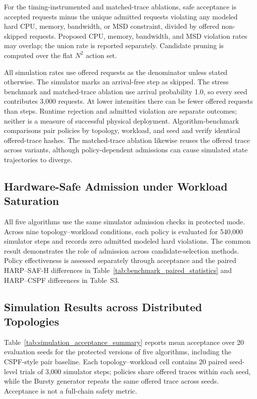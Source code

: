 \documentclass[final,5p]{elsarticle}
\newcommand{\rev}[1]{\textcolor{revisiongreen}{#1}}
\let\newrev\rev
\begin{document}
\newrev{For the timing-instrumented and matched-trace ablations, safe acceptance is accepted requests minus the unique admitted requests violating any modeled hard CPU, memory, bandwidth, or MSD constraint, divided by offered non-skipped requests. Proposed CPU, memory, bandwidth, and MSD violation rates may overlap; the union rate is reported separately. Candidate pruning is computed over the flat $N^2$ action set.}

\newrev{All simulation rates use offered requests as the denominator unless stated otherwise. The simulator marks an arrival-free step as skipped. The stress benchmark and matched-trace ablation use arrival probability 1.0, so every seed contributes 3,000 requests. At lower intensities there can be fewer offered requests than steps. Runtime rejection and admitted violation are separate outcomes; neither is a measure of successful physical deployment. Algorithm-benchmark comparisons pair policies by topology, workload, and seed and verify identical offered-trace hashes. The matched-trace ablation likewise reuses the offered trace across variants, although policy-dependent admissions can cause simulated state trajectories to diverge.}

\subsection{\newrev{Hardware-Safe Admission under Workload Saturation}}
\newrev{All five algorithms use the same simulator admission checks in protected mode. Across nine topology--workload conditions, each policy is evaluated for 540,000 simulator steps and records zero admitted modeled hard violations. The common result demonstrates the role of admission across candidate-selection methods. Policy effectiveness is assessed separately through acceptance and the paired HARP--SAF-H differences in Table~\ref{tab:benchmark_paired_statistics} and HARP--CSPF differences in Table~S3.}



\subsection{\newrev{Simulation Results across Distributed Topologies}}
\label{subsec:simulation_results}
\newrev{Table~\ref{tab:simulation_acceptance_summary} reports mean acceptance over 20 evaluation seeds for the protected versions of five algorithms, including the CSPF-style pair baseline. Each topology--workload cell contains 20 paired seed-level trials of 3,000 simulator steps; policies share offered traces within each seed, while the Bursty generator repeats the same offered trace across seeds. Acceptance is not a full-chain safety metric.}
\end{document}
